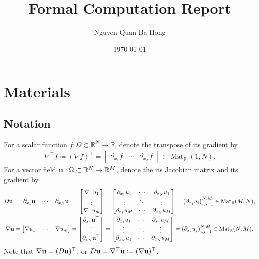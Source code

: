 \documentclass[oneside]{book}
\title{Formal Computation Report}
\author{Nguyen Quan Ba Hong}
\date{\today}
\numberwithin{equation}{section}
\begin{document}
\maketitle
\setcounter{secnumdepth}{6}
\setcounter{tocdepth}{6}
\tableofcontents


\chapter{Materials}

\section{Notation}
For a scalar function $f:\Omega\subset\mathbb{R}^N\to\mathbb{R}$, denote the transpose of its gradient by
\begin{align*}
    \nabla^\top f\coloneqq(\nabla f)^\top = \begin{bmatrix}
        \partial_{x_1}f & \cdots & \partial_{x_N}f
    \end{bmatrix}\in\operatorname{Mat}_\mathbb{R}(1,N).
\end{align*}
For a vector field ${\bf u}:\Omega\subset\mathbb{R}^N\to\mathbb{R}^M$, denote the its Jacobian matrix and its gradient by
\begin{align*}
    D{\bf u} = \begin{bmatrix}
        \partial_{x_1}{\bf u} & \cdots & \partial_{x_N}{\bf u}
    \end{bmatrix} = \begin{bmatrix}
        \nabla^\top u_1\\\vdots\\ \nabla^\top u_m
    \end{bmatrix} &= \begin{bmatrix}
        \partial_{x_1}u_1 & \cdots & \partial_{x_N}u_1\\\vdots & \ddots & \vdots\\ \partial_{x_1}u_M & \cdots & \partial_{x_N}u_M
    \end{bmatrix} = \left(\partial_{x_j}u_i\right)_{i,j=1}^{N,M}\in\operatorname{Mat}_\mathbb{R}(M,N),\\
    \nabla{\bf u} = \begin{bmatrix}
        \nabla u_1 & \cdots & \nabla u_m
    \end{bmatrix} = \begin{bmatrix}
        \partial_{x_1}{\bf u}^\top\\\vdots\\ \partial_{x_N}{\bf u}^\top
    \end{bmatrix} &= \begin{bmatrix}
    \partial_{x_1}u_1 & \cdots & \partial_{x_1}u_M\\\vdots & \ddots & \vdots\\ \partial_{x_N}u_1 & \cdots & \partial_{x_N}u_M
\end{bmatrix} = \left(\partial_{x_i}u_j\right)_{i,j=1}^{N,M}\in\operatorname{Mat}_\mathbb{R}(N,M).
\end{align*}
Note that $\nabla{\bf u} = (D{\bf u})^\top$, or $D{\bf u} = \nabla^\top{\bf u}\coloneqq(\nabla{\bf u})^\top$.
\end{document}
